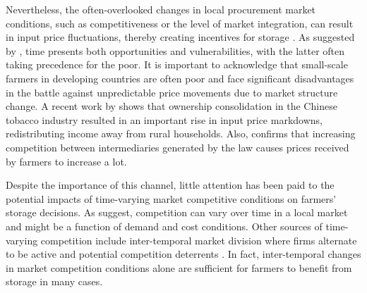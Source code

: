 Nevertheless, the often-overlooked changes in local procurement market conditions, such as competitiveness or the level of market integration, can result in input price fluctuations, thereby creating incentives for storage \citep{dries2009farmers,kopp2021farmers}. As suggested by \cite{zimmerman2003asset}, time presents both opportunities and vulnerabilities, with the latter often taking precedence for the poor. It is important to acknowledge that small-scale farmers in developing countries are often poor and face significant disadvantages in the battle against unpredictable price movements due to market structure change. A recent work by \cite{rubens2023market} shows that ownership consolidation in the Chinese tobacco industry resulted in an important rise in input price markdowns, redistributing income away from rural households. Also, \cite{chatterjee2023market} confirms that increasing competition between intermediaries generated by the law causes prices received by farmers to increase a lot. 



Despite the importance of this channel, little attention has been paid to the potential impacts of time-varying market competitive conditions on farmers’ storage decisions. As \cite{sudhir2005time} suggest, competition can vary over time in a local market and might be a function of demand and cost conditions. Other sources of time-varying competition include inter-temporal market division where firms alternate to be active \citep{herings2005intertemporal} and potential competition deterrents \citep{gilbert1989role, stiglitz1981potential}. In fact, inter-temporal changes in market competition conditions alone are sufficient for farmers to benefit from storage in many cases. 


